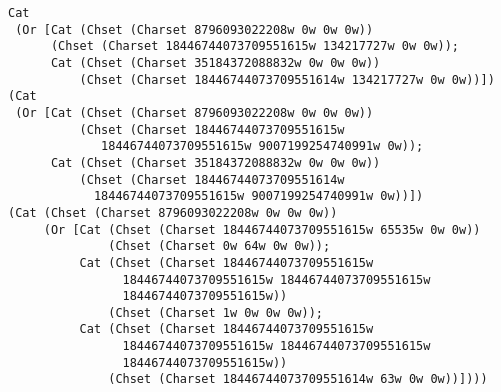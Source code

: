 \documentclass{beamer}
\begin{document}
\begin{frame}
\begin{itemize}
{\tiny
\begin{verbatim}
Cat
 (Or [Cat (Chset (Charset 8796093022208w 0w 0w 0w))
      (Chset (Charset 18446744073709551615w 134217727w 0w 0w));
      Cat (Chset (Charset 35184372088832w 0w 0w 0w))
          (Chset (Charset 18446744073709551614w 134217727w 0w 0w))])
(Cat
 (Or [Cat (Chset (Charset 8796093022208w 0w 0w 0w))
          (Chset (Charset 18446744073709551615w 
             18446744073709551615w 9007199254740991w 0w));
      Cat (Chset (Charset 35184372088832w 0w 0w 0w))
          (Chset (Charset 18446744073709551614w 
            18446744073709551615w 9007199254740991w 0w))])
(Cat (Chset (Charset 8796093022208w 0w 0w 0w))
     (Or [Cat (Chset (Charset 18446744073709551615w 65535w 0w 0w))
              (Chset (Charset 0w 64w 0w 0w));
          Cat (Chset (Charset 18446744073709551615w 
                18446744073709551615w 18446744073709551615w 
                18446744073709551615w))
              (Chset (Charset 1w 0w 0w 0w));
          Cat (Chset (Charset 18446744073709551615w 
                18446744073709551615w 18446744073709551615w 
                18446744073709551615w))
              (Chset (Charset 18446744073709551614w 63w 0w 0w))])))
\end{verbatim}
}

\end{itemize}
\end{frame}
\end{document}
